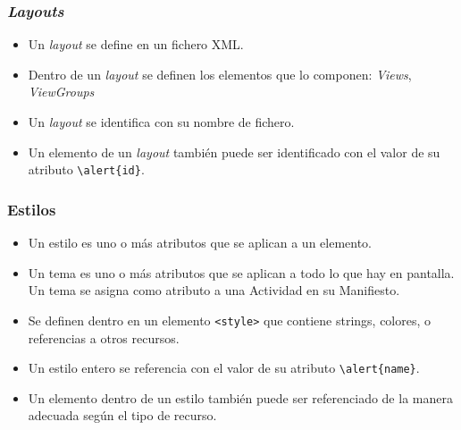 \documentclass[hyperref={pdfpagelabels=true},ucs]{beamer}
\begin{document}
\begin{frame}[fragile]
\frametitle{\emph{Layouts}}

\begin{itemize}
\item Un \emph{layout} se define en un fichero XML.
\item Dentro de un \emph{layout} se definen los elementos que lo
  componen: \emph{Views}, \emph{ViewGroups}
\item \alert{Un \emph{layout} se identifica con su
    nombre de fichero}.
\item \alert{Un elemento de un \emph{layout} también puede ser
    identificado con el valor de su atributo} \Verb|\alert{id}|.
\end{itemize}

\end{frame}


\begin{frame}[fragile]
\frametitle{Estilos}

\begin{itemize}
\item Un estilo es uno o más atributos que se aplican a un elemento.
\item Un tema es uno o más atributos que se aplican a todo lo que hay
  en pantalla. Un tema se asigna como atributo a una Actividad en su
  Manifiesto.
\item Se definen dentro en un elemento \verb|<style>| que contiene
  strings, colores, o referencias a otros recursos.
\item \alert{Un estilo entero se referencia con el
    valor de su atributo} \Verb|\alert{name}|.
\item \alert{Un elemento dentro de un estilo también puede ser
    referenciado de la manera adecuada según el tipo de recurso}.
\end{itemize}

\end{frame}
\end{document}
